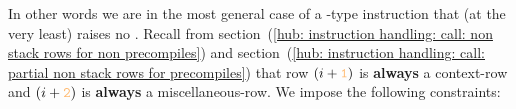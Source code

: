 \begin{center}
\end{center}
In other words we are in the most general case of a -type instruction that (at the very least) raises no \suxSH{}. 
Recall from
section~(\ref{hub: instruction handling: call: non stack rows for non precompiles}) and
section~(\ref{hub: instruction handling: call: partial non stack rows for precompiles})
that row
$(i + \callCurrentContextRowOffset)$ is \textbf{always} a context-row and
$(i + \callMiscRowOffset)$ is \textbf{always} a miscellaneous-row.
We impose the following constraints:
